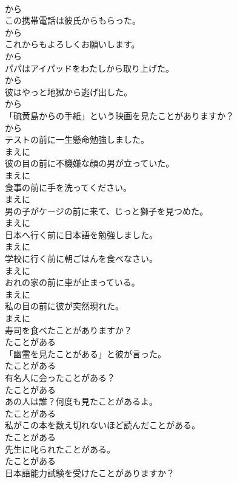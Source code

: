 \documentclass[8pt]{extreport}
\begin{document}
\begin{CJK}{UTF8}{min}
\\	から
\\	この携帯電話は彼氏からもらった。	
\\	から
\\	これからもよろしくお願いします。	
\\	から
\\	パパはアイパッドをわたしから取り上げた。	
\\	から
\\	彼はやっと地獄から逃げ出した。	
\\	から
\\	「硫黄島からの手紙」という映画を見たことがありますか？	
\\	から
\\	テストの前に一生懸命勉強しました。	
\\	まえに
\\	彼の目の前に不機嫌な顔の男が立っていた。	
\\	まえに
\\	食事の前に手を洗ってください。	
\\	まえに
\\	男の子がケージの前に来て、じっと獅子を見つめた。	
\\	まえに
\\	日本へ行く前に日本語を勉強しました。	
\\	まえに
\\	学校に行く前に朝ごはんを食べなさい。	
\\	まえに
\\	おれの家の前に車が止まっている。	
\\	まえに
\\	私の目の前に彼が突然現れた。	
\\	まえに
\\	寿司を食べたことがありますか？	
\\	たことがある
\\	「幽霊を見たことがある」と彼が言った。	
\\	たことがある
\\	有名人に会ったことがある？	
\\	たことがある
\\	あの人は誰？何度も見たことがあるよ。	
\\	たことがある
\\	私がこの本を数え切れないほど読んだことがある。	
\\	たことがある
\\	先生に叱られたことがある。	
\\	たことがある
\\	日本語能力試験を受けたことがありますか？	

\end{CJK}
\end{document}
